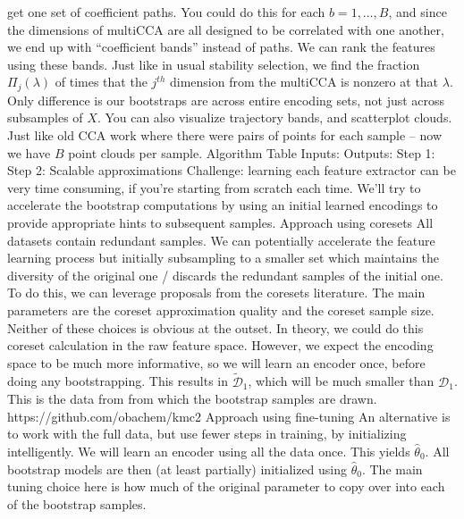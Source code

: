 \documentclass[11pt]{article}
\begin{document}
\begin{outline}
      get one set of coefficient paths. You could do this for each $b = 1,
      \dots, B$, and since the dimensions of multiCCA are all designed to be
      correlated with one another, we end up with ``coefficient bands'' instead
      of paths.
      \4 We can rank the features using these bands. Just like in usual
      stability selection, we find the fraction $\Pi_{j}\left(\lambda\right)$ of
      times that the $j^{th}$ dimension from the multiCCA is nonzero at that
      $\lambda$. Only difference is our bootstraps are across entire encoding
      sets, not just across subsamples of $X$.
      \4 You can also visualize trajectory bands, and scatterplot clouds. Just
      like old CCA work where there were pairs of points for each sample -- now
      we have $B$ point clouds per sample.
\1 Algorithm Table
  \2 Inputs:
  \2 Outputs:
  \2 Step 1:
  \2 Step 2:
\1 Scalable approximations
  \2 Challenge: learning each feature extractor can be very time consuming, if
  you're starting from scratch each time. We'll try to accelerate the bootstrap
  computations by using an initial learned encodings to provide appropriate
  hints to subsequent samples.
  \2 Approach using coresets
    \3 All datasets contain redundant samples. We can potentially accelerate the
    feature learning process but initially subsampling to a smaller set which
    maintains the diversity of the original one / discards the redundant samples
    of the initial one.
    \3 To do this, we can leverage proposals from the coresets literature. The
    main parameters are the coreset approximation quality and the coreset sample
    size. Neither of these choices is obvious at the outset.
    \3 In theory, we could do this coreset calculation in the raw feature space.
    However, we expect the encoding space to be much more informative, so we
    will learn an encoder once, before doing any bootstrapping.
      \4 This results in $\tilde{\mathcal{D}}_{1}$, which will be much smaller
      than $\mathcal{D}_{1}$.
      \4 This is the data from from which the bootstrap samples are drawn.
    \3 https://github.com/obachem/kmc2
  \2 Approach using fine-tuning
    \3 An alternative is to work with the full data, but use fewer steps in
    training, by initializing intelligently.
    \3 We will learn an encoder using all the data once. This yields
    $\hat{\theta}_{0}$.
    \3 All bootstrap models are then (at least partially) initialized using
    $\hat{\theta}_{0}$.
    \3 The main tuning choice here is how much of the original parameter to copy
    over into each of the bootstrap samples.

\end{outline}
\end{document}
